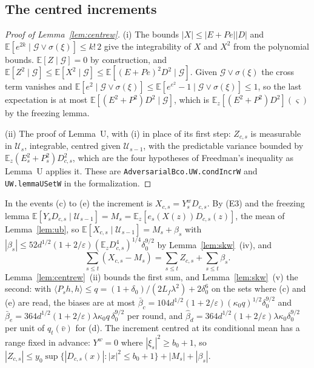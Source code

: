 \documentclass[11pt]{amsart}
\theoremstyle{definition}
\numberwithin{equation}{section}
\newcommand{\E}{\mathbb{E}}
\newcommand{\ip}[1]{\langle #1\rangle}
\begin{document}
\subsection*{The centred increments}

\begin{proof}[Proof of Lemma~\ref{lem:centrew}]
(i) The bounds $|X|\le|E+Pe||D|$ and $\E[e^{2k}\mid\mathcal G\vee\sigma(\xi)]\le k!\,2$ give the integrability of $X$ and $X^2$ from the polynomial bounds. $\E[Z\mid\mathcal G]=0$ by construction, and $\E[Z^2\mid\mathcal G]\le\E[X^2\mid\mathcal G]\le\E[(E+Pe)^2D^2\mid\mathcal G]$. Given $\mathcal G\vee\sigma(\xi)$ the cross term vanishes and $\E[e^2\mid\mathcal G\vee\sigma(\xi)]\le\E[e^{e^2}-1\mid\mathcal G\vee\sigma(\xi)]\le1$, so the last expectation is at most $\E[(E^2+P^2)D^2\mid\mathcal G]$, which is $\E_z[(E^2+P^2)D^2](\varsigma)$ by the freezing lemma.

(ii) The proof of Lemma~U, with (i) in place of its first step: $Z_{c,s}$ is measurable in $\mathcal U_s$, integrable, centred given $\mathcal U_{s-1}$, with the predictable variance bounded by $\E_z(E_s^2+P_s^2)D_{c,s}^2$, which are the four hypotheses of Freedman's inequality as Lemma~U applies it. These are \texttt{AdversarialBco.\allowbreak UW.\allowbreak condIncrW} and \texttt{UW.\allowbreak lemmaUSetW} in the formalization.
\end{proof}

In the events (c) to (e) the increment is $X_{c,s}=Y^w_sD_{c,s}$. By (E3) and the freezing lemma $\E[Y_sD_{c,s}\mid\mathcal U_{s-1}]=M_s=\E_z[e_s(X(z))D_{c,s}(z)]$, the mean of Lemma~\ref{lem:ub}, so $\E[X_{c,s}\mid\mathcal U_{s-1}]=M_s+\beta_s$ with $|\beta_s|\le52d^{1/2}(1+2/\varepsilon)(\E_zD_{c,s}^4)^{1/4}\delta_0^{9/2}$ by Lemma~\ref{lem:skw}~(iv), and
\[
\sum_{s\le t}(X_{c,s}-M_s)=\sum_{s\le t}Z_{c,s}+\sum_{s\le t}\beta_s .
\]
Lemma~\ref{lem:centrew}~(ii) bounds the first sum, and Lemma~\ref{lem:skw}~(v) the second: with $\ip{P_sh,h}\le q=(1+\delta_0)/(2L_f\lambda^2)+2\delta_0^6$ on the sets where (c) and (e) are read, the biases are at most $\bar\beta_c=104d^{1/2}(1+2/\varepsilon)(\kappa_0q)^{1/2}\delta_0^{9/2}$ and $\bar\beta_e=364d^{1/2}(1+2/\varepsilon)\lambda\kappa_0q\,\delta_0^{9/2}$ per round, and $\hat\beta_d=364d^{1/2}(1+2/\varepsilon)\lambda\kappa_0\delta_0^{9/2}$ per unit of $q_t(\bar v)$ for (d). The increment centred at its conditional mean has a range fixed in advance: $Y^w=0$ where $|\xi_s|^2\ge b_0+1$, so $|Z_{c,s}|\le y_0\sup\{|D_{c,s}(x)|:|x|^2\le b_0+1\}+|M_s|+|\beta_s|$.
\end{document}
